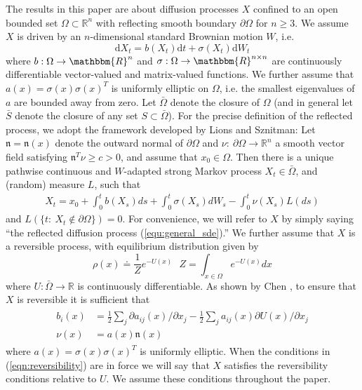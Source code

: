 \documentclass[12pt, nofootinbib,english, amsmath, amssymb, aps, priprint, graphicx,floatfix]{revtex4-1}
\theoremstyle{plain}
\theoremstyle{definition}
\theoremstyle{plain}
\newcommand{\normal}{{\mathfrak{n}}}
\begin{document}
The results in this paper are about diffusion processes $X$ confined to an open bounded set $\Omega \subset \mathbb{R}^n$ with reflecting smooth boundary $\partial\Omega$ for $n\geq 3$.  We assume $X$ is driven by an $n$-dimensional standard Brownian motion $W$, i.e.
\begin{equation}\label{equ:general_sde}\mathrm{d} X_t = b (X_t) \mathrm{d} t + \sigma (X_t) \mathrm{d} W_t \end{equation}
where $b: \Omega \rightarrow \mathbbm{R}^n$ and $\sigma :
\Omega \rightarrow \mathbbm{R}^{n \times n}$ are continuously differentiable vector-valued and matrix-valued functions.  We further assume that $a(x)=\sigma(x)\sigma(x)^T$ is uniformly elliptic on $\Omega$, i.e. the smallest eigenvalues of $a$ are bounded away from zero.  Let $\bar \Omega$ denote the closure of $\Omega$ (and in general let $\bar S$ denote the closure of any set $S\subset \bar \Omega$).  For the precise definition of the reflected process, we adopt the framework developed by Lions and Sznitman\cite{lions1984stochastic}: Let $\normal=\normal(x)$ denote the outward normal of $\partial \Omega$ and $\nu:\ \partial \Omega \rightarrow \mathbb{R}^n$ a smooth vector field satisfying $\normal^T\nu\geq c>0$, and assume that $x_0 \in \Omega$.  Then there is a unique pathwise continuous
and $W$-adapted strong Markov process $X_t\in\bar\Omega$, and (random) measure $L$, such that
\begin{gather}\label{eq:SDER}
X_t = x_0 + \int_0^t b(X_s)ds + \int_0^t \sigma(X_s)dW_s - \int_0^t \nu(X_s) L(ds)
\end{gather}
and $L(\{t:\ X_t \notin \partial \Omega\})=0$.
For convenience, we will refer to $X$ by simply saying ``the reflected diffusion process (\ref{equ:general_sde}).'' We further assume that $X$ is a reversible process, with equilibrium distribution given by
\[
\rho(x)\doteq \frac{1}{Z}e^{-U(x)}\ \ \
Z=\int_{x\in\Omega}e^{-U(x)}dx
\]
where $U:\bar \Omega \rightarrow \mathbb{R}$ is continuously differentiable.  As shown by Chen \cite{chen1993reflecting}, to ensure that $X$ is reversible it is sufficient that
\begin{align}
\begin{split}
b_i(x)&=\frac{1}{2} \sum_j \partial a_{ij}(x)/\partial x_j - \frac{1}{2}\sum_j a_{ij}(x) \partial U(x)/\partial x_j
\label{eqn:reversibility} \\
\nu(x)&= a(x) \normal(x)
\end{split}
\end{align}
where $a(x)=\sigma(x)\sigma(x)^T$ is uniformly elliptic.
When the conditions in (\ref{eqn:reversibility}) are in force
we will say that $X$ satisfies the reversibility conditions relative to $U$.  We assume these conditions throughout the paper.
\end{document}
